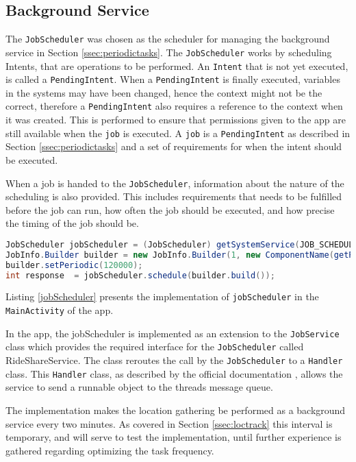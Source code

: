 \subsection{Background Service}
The \texttt{JobScheduler} was chosen as the scheduler for managing the background service in Section \ref{ssec:periodictasks}.
The \texttt{JobScheduler} works by scheduling Intents, that are operations to be performed. 
An \texttt{Intent} that is not yet executed, is called a \texttt{PendingIntent}.
When a \texttt{PendingIntent} is finally executed, variables in the systems may have been changed, hence the context might not be the correct, therefore a \texttt{PendingIntent} also requires a reference to the context when it was created.
This is performed to ensure that permissions given to the app are still available when the \texttt{job} is executed.
A \texttt{job} is a \texttt{PendingIntent} as described in Section \ref{ssec:periodictasks} and a set of requirements for when the intent should be executed.

When a job is handed to the \texttt{JobScheduler}, information about the nature of the scheduling is also provided.
This includes requirements that needs to be fulfilled before the job can run, how often the job should be executed, and how precise the timing of the job should be.

\begin{lstlisting}[language=Java, label=jobScheduler, caption=The implementation of jobScheduler.]
JobScheduler jobScheduler = (JobScheduler) getSystemService(JOB_SCHEDULER_SERVICE);
JobInfo.Builder builder = new JobInfo.Builder(1, new ComponentName(getPackageName(), RideShareService.class.getName()));
builder.setPeriodic(120000);
int response  = jobScheduler.schedule(builder.build());	
\end{lstlisting}

Listing \ref{jobScheduler} presents the implementation of \texttt{jobScheduler} in the \texttt{MainActivity} of the app.

In the app, the jobScheduler is implemented as an extension to the \texttt{JobService} class which provides the required interface for the \texttt{JobScheduler} called RideShareService.
The class reroutes the call by the \texttt{JobScheduler} to a \texttt{Handler} class.
This \texttt{Handler} class, as described by the official documentation \cite{handler}, allows the service to send a runnable object to the threads message queue.


The implementation makes the location gathering be performed as a background service every two minutes.
As covered in Section \ref{ssec:loctrack} this interval is temporary, and will serve to test the implementation, until further experience is gathered regarding optimizing the task frequency.


